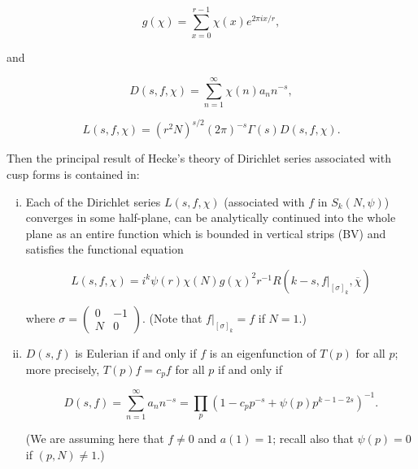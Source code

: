 \[
g(\chi) = \sum_{x=0}^{r-1} \chi(x) e^{2\pi ix/r},
\]

and

\begin{equation}\label{eq:1.25}
D(s,f,\chi) = \sum_{n=1}^{\infty} \chi(n) a_n n^{-s},\tag{1.25}
\end{equation}

\begin{equation}\label{eq:1.26}
L(s,f,\chi) = (r^2 N)^{s/2} (2\pi)^{-s} \Gamma(s) D(s,f,\chi).\tag{1.26}
\end{equation}

Then the principal result of Hecke's theory of Dirichlet series associated with cusp forms is contained in:

\begin{theorem}\label{thm:1.9}

\begin{enumerate}[(i)]

\item Each of the Dirichlet series $L(s,f,\chi)$ (associated with $f$ in $S_k(N,\psi)$) converges in some half-plane, can be analytically continued into the whole plane as an entire function which is bounded in vertical strips (BV) and satisfies the functional equation

\begin{equation}\label{eq:1.27}
L(s,f,\chi) = i^k \psi(r) \chi(N) g(\chi)^2 r^{-1} R(k - s, f|_{[\sigma]_k}, \overline{\chi})\tag{1.27}
\end{equation}

where $\sigma = \begin{pmatrix} 0 & -1 \\ N & 0 \end{pmatrix}$. (Note that $f|_{[\sigma]_k} = f$ if $N = 1$.)

\item $D(s,f)$ is Eulerian if and only if $f$ is an eigenfunction of $T(p)$ for all $p$; more precisely, $T(p)f = c_p f$ for all $p$ if and only if

\begin{equation}\label{eq:1.28}
D(s,f) = \sum_{n=1}^{\infty} a_n n^{-s} = \prod_p \left(1 - c_p p^{-s} + \psi(p) p^{k-1-2s}\right)^{-1}.\tag{1.28}
\end{equation}

(We are assuming here that $f \neq 0$ and $a(1) = 1$; recall also that $\psi(p) = 0$ if $(p,N) \neq 1$.)

\end{enumerate}

\end{theorem}

